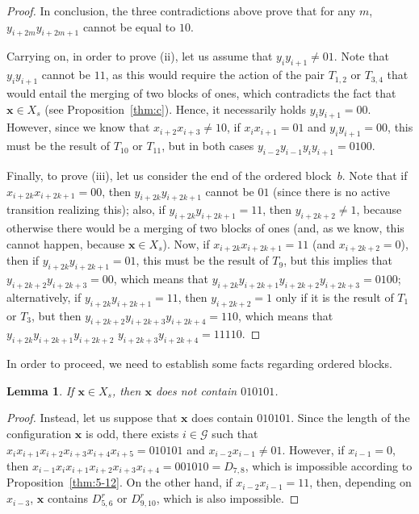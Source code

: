 \documentclass{sn-jnl}
\newtheorem{lem}{Lemma}%
\newcommand{\xconst}{X_{s}}
\newcommand{\bx}{\mathbf{x}}
\newcommand{\G}{\mathcal{G} }
\begin{document}
\begin{proof}
In conclusion, the three contradictions above prove that for any $m$, $y_{i+2m}y_{i+2m+1}$ cannot be equal to $10$. 

Carrying on, in order to prove (ii), let us assume that $y_iy_{i+1} \neq 01$. Note that $y_iy_{i+1}$ cannot be $11$, as this would require the action of the pair $T_{1,2}$ or $T_{3,4}$ that would entail the merging of two blocks of ones, which contradicts the fact that $\bx\in \xconst$ (see Proposition~\ref{thm:c}). Hence, it necessarily holds $y_iy_{i+1} = 00$. However, since we know that $x_{i+2}x_{i+3} \neq 10$, if $x_ix_{i+1} = 01$ and $y_iy_{i+1} = 00$, this must be the result of $T_{10}$ or $T_{11}$, but in both cases $y_{i-2}y_{i-1}y_iy_{i+1} = 0100$.

Finally, to prove (iii), let us consider the end of the ordered block~$b$. Note that if $x_{i+2k}x_{i+2k+1}=00$, then $y_{i+2k}y_{i+2k+1}$ cannot be $01$ (since there is no active transition realizing this); also, if $y_{i+2k}y_{i+2k+1} = 11$, then $y_{i+2k+2}\neq 1$, because otherwise there would be a merging of two blocks of ones (and, as we know, this cannot happen, because $\bx\in \xconst$). Now, if $x_{i+2k}x_{i+2k+1}=11$ (and $x_{i+2k+2}=0$), then if $y_{i+2k}y_{i+2k+1} = 01$, this must be the result of $T_9$, but this implies that $y_{i+2k+2}y_{i+2k+3} = 00$, which means that $y_{i+2k}y_{i+2k+1}y_{i+2k+2}y_{i+2k+3} = 0100$; alternatively, if $y_{i+2k}y_{i+2k+1} = 11$, then $y_{i+2k+2}=1$ only if it is the result of $T_1$ or $T_3$, but then $y_{i+2k+2}y_{i+2k+3}y_{i+2k+4} = 110$, which means that $y_{i+2k}y_{i+2k+1}y_{i+2k+2}$ $y_{i+2k+3}y_{i+2k+4} = 11110$.

\end{proof}

In order to proceed, we need to establish some facts regarding ordered blocks.

\begin{lem}\label{lem:alter}
If $\bx\in \xconst$, then $\bx$ does not contain $010101$.
\end{lem}

\begin{proof}
Instead, let us suppose that $\bx$ does contain $010101$. Since the length of the configuration $\bx$ is odd, there exists $i\in\G$ such that $x_ix_{i+1}x_{i+2}x_{i+3}x_{i+4}x_{i+5}=010101$ and $x_{i-2}x_{i-1}\neq 01$. However, if $x_{i-1} = 0$, then $x_{i-1}x_ix_{i+1}x_{i+2}x_{i+3}x_{i+4}=001010 = D_{7,8}$, which is impossible according to Proposition~\ref{thm:5-12}. On the other hand, if $x_{i-2}x_{i-1} = 11 $, then, depending on $x_{i-3}$, $\bx$ contains $D_{5,6}^r$ or $D_{9,10}^r$, which is also impossible. 
\end{proof}
\end{document}
